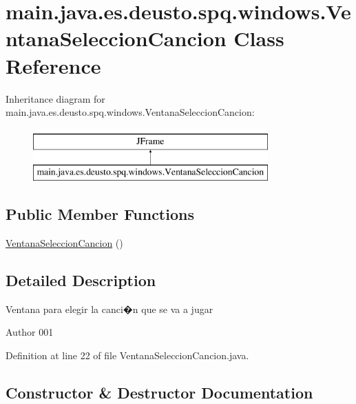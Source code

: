 \hypertarget{classmain_1_1java_1_1es_1_1deusto_1_1spq_1_1windows_1_1_ventana_seleccion_cancion}{}\section{main.\+java.\+es.\+deusto.\+spq.\+windows.\+Ventana\+Seleccion\+Cancion Class Reference}
\label{classmain_1_1java_1_1es_1_1deusto_1_1spq_1_1windows_1_1_ventana_seleccion_cancion}
Inheritance diagram for main.\+java.\+es.\+deusto.\+spq.\+windows.\+Ventana\+Seleccion\+Cancion\+:\begin{figure}[H]
\begin{center}
\leavevmode
\includegraphics[height=2.000000cm]{classmain_1_1java_1_1es_1_1deusto_1_1spq_1_1windows_1_1_ventana_seleccion_cancion}
\end{center}
\end{figure}
\subsection*{Public Member Functions}
\begin{DoxyCompactItemize}
\item 
\hyperlink{classmain_1_1java_1_1es_1_1deusto_1_1spq_1_1windows_1_1_ventana_seleccion_cancion_ad8166ac2780667cca7441ef4f5bd4c14}{Ventana\+Seleccion\+Cancion} ()
\end{DoxyCompactItemize}


\subsection{Detailed Description}
Ventana para elegir la canci�n que se va a jugar \begin{DoxyAuthor}{Author}
001 
\end{DoxyAuthor}


Definition at line 22 of file Ventana\+Seleccion\+Cancion.\+java.



\subsection{Constructor \& Destructor Documentation}
